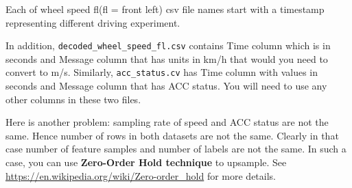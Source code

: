 \documentclass[12pt, xcolor=dvipsnames,svgnames,x11names]{article}
\begin{document}
Each of wheel speed fl(fl = front left) csv file names start with a timestamp representing different driving experiment.

In addition, \texttt{decoded\_wheel\_speed\_fl.csv} contains Time column which is in seconds and Message column that has units in km/h that would you need to convert to m/s. Similarly, \texttt{acc\_status.cv} has Time column with values in seconds and Message column that has ACC status. You will need to use any other columns in these two files.

Here is another problem: sampling rate of speed and ACC status are not the same. Hence number of rows in both datasets are not the same. Clearly in that case number of feature samples and number of labels are not the same. In such a case, you can use \textbf{Zero-Order Hold technique} to upsample. See \url{https://en.wikipedia.org/wiki/Zero-order_hold} for more details.
\end{document}
